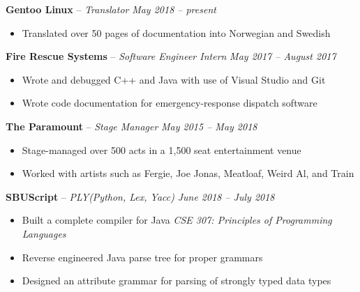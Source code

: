 \documentclass[11pt,letterpaper]{article}
\begin{document}
\spacedhrule{0.2em}{-0.8em} 




\headedsection
{\textbf{Gentoo Linux} -- \textit{Translator}}
{\textit{May 2018 -- present}} {
	\begin{itemize}[noitemsep,nolistsep]
		\item Translated over 50 pages of documentation into Norwegian and Swedish
	\end{itemize}
}


\headedsection 
{\textbf{Fire Rescue Systems} -- \textit{Software Engineer Intern}}
{\textit{May 2017 -- August 2017}} {
	\begin{itemize}[noitemsep,nolistsep]
		\item Wrote and debugged C++ and Java with use of Visual Studio and Git
		\item Wrote code documentation for emergency-response dispatch software
	\end{itemize}
}


\headedsection 
{\textbf{The Paramount} -- \textit{Stage Manager}}
{\textit{May 2015 -- May 2018}} {
	\begin{itemize}[noitemsep,nolistsep]
		\item Stage-managed over 500 acts in a 1,500 seat entertainment venue
		\item Worked with artists such as Fergie, Joe Jonas, Meatloaf, Weird Al, and Train
	\end{itemize}
}


\spacedhrule{0.2em}{-0.8em} 




\headedsection 
{\textbf{SBUScript} -- \textit{PLY(Python, Lex, Yacc)}}
{\textit{June 2018 -- July 2018}} {
	\begin{itemize}[noitemsep,nolistsep]
		\item Built a complete compiler for Java \textit{CSE 307: Principles of Programming Languages}
		\item Reverse engineered Java parse tree for proper grammars
		\item Designed an attribute grammar for parsing of strongly typed data types
	\end{itemize}
}
					
\end{document}
